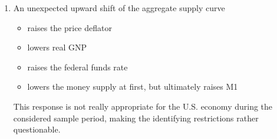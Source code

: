 \begin{enumerate}
\item An unexpected upward shift of the aggregate supply curve
\begin{itemize}
\item raises the price deflator
\item lowers real GNP
\item raises the federal funds rate
\item lowers the money supply at first, but ultimately raises M1
\end{itemize}
This response is not really appropriate for the U.S. economy during the considered sample period,
  making the identifying restrictions rather questionable.
\end{enumerate}